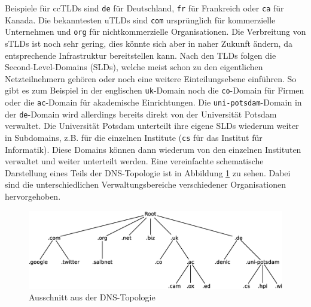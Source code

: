 \documentclass[a4paper, 12pt, BCOR10mm, DIV12, toc=bibliography, toc=listof, german]{scrbook}
\begin{document}
				Beispiele für ccTLDs sind \texttt{de} für Deutschland, \texttt{fr} für Frankreich oder
				\texttt{ca} für Kanada. Die bekanntesten uTLDs sind \texttt{com} ursprünglich für
				kommerzielle Unternehmen und \texttt{org} für nichtkommerzielle Organisationen. Die
				Verbreitung von sTLDs ist noch sehr gering, dies könnte sich aber in naher Zukunft ändern,
				da entsprechende Infrastruktur bereitstellen kann. Nach den TLDs folgen die
				Second-Level-Domains (SLDs), welche meist schon zu den eigentlichen Netzteilnehmern gehören
				oder noch eine weitere Einteilungsebene einführen. So gibt es zum Beispiel in der englischen
				\texttt{uk}-Domain noch die \texttt{co}-Domain für Firmen oder die \texttt{ac}-Domain für
				akademische Einrichtungen. Die \texttt{uni-potsdam}-Domain in der \texttt{de}-Domain wird
				allerdings bereits direkt von der Universität Potsdam verwaltet. Die Universität Potsdam
				unterteilt ihre eigene SLDs wiederum weiter in Subdomains, z.B. für die einzelnen Institute
				(\texttt{cs} für das Institut für Informatik). Diese Domains können dann wiederum von den
				einzelnen Instituten verwaltet und weiter unterteilt werden. Eine vereinfachte schematische
				Darstellung eines Teils der DNS-Topologie ist in Abbildung \ref{fig:dns-tree} zu sehen.
				Dabei sind die unterschiedlichen Verwaltungsbereiche verschiedener Organisationen
				hervorgehoben.


				\begin{figure}
					\centering
					\includegraphics[width=\textwidth]{images/dns-tree-domains}
					\caption{Ausschnitt aus der DNS-Topologie} %
					\label{fig:dns-tree}
				\end{figure}

\end{document}
